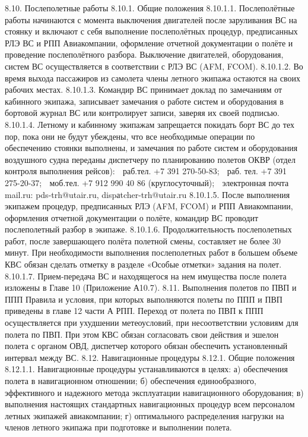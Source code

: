 8.10.	Послеполетные работы
8.10.1.	Общие положения
8.10.1.1. Послеполётные работы начинаются с момента выключения двигателей после заруливания ВС на стоянку и включают с себя выполнение послеполётных процедур, предписанных РЛЭ ВС и РПП Авиакомпании, оформление отчетной документации о полёте и проведение послеполётного разбора.
Выключение двигателей, оборудования, систем ВС осуществляется в соответствии с РЛЭ ВС (AFM, FCOM).       
8.10.1.2. Во время выхода пассажиров из самолета члены летного экипажа остаются на своих рабочих 
местах.
8.10.1.3. Командир ВС принимает доклад по замечаниям от кабинного экипажа, записывает замечания о работе систем и оборудования в бортовой журнал ВС или контролирует записи, заверяя их своей подписью.
8.10.1.4. Летному и кабинному экипажам запрещается покидать борт ВС до тех пор, пока они не будут убеждены, что все необходимые операции по обеспечению стоянки выполнены, и замечания по работе систем и оборудования воздушного судна переданы диспетчеру по планированию полетов ОКВР (отдел контроля выполнения рейсов):
 раб.тел. +7 391 270-50-83;
 раб. тел. +7 391 275-20-37;
 моб.тел. +7 912 990 40 86 (круглосуточный);
 электронная почта mail.ru: pds-trh@utair.ru, dispаtcher-trh@utair.ru
8.10.1.5. После выполнения экипажем процедур, предписанных РЛЭ (AFM, FCOM) и РПП Авиакомпании, оформления отчетной документации о полёте, командир ВС проводит послеполетный разбор в экипаже.
8.10.1.6. Продолжительность послеполетных работ, после завершающего полёта полетной смены, составляет не более 30 минут. При необходимости выполнения послеполетных работ в большем объеме КВС обязан сделать отметку в разделе «Особые отметки» задания на полет.
8.10.1.7. Прием-передача ВС и находящегося на нем имущества после полета изложены в Главе 10 (Приложение А10.7).
8.11.	Выполнения полетов по ПВП и ППП
Правила и условия, при которых выполняются полеты по ППП и ПВП приведены в главе 12 части А РПП. Переход от полета по ПВП к ППП осуществляется при ухудшении метеоусловий, при несоответствии условиям для полета по ПВП. При этом КВС обязан согласовать свои действия и эшелон полета с органом ОВД, диспетчер которого обязан обеспечить установленный интервал между ВС.
8.12.	Навигационные процедуры
8.12.1. Общие положения
8.12.1.1. Навигационные процедуры устанавливаются в целях: 
а)	обеспечения полета в навигационном отношении;
б)	обеспечения единообразного, эффективного и надежного метода эксплуатации навигационного оборудования;
в)	выполнения настоящих стандартных навигационных процедур всем персоналом летных экипажей авиакомпании;
г)	оптимального распределения нагрузки на членов летного экипажа при подготовке и выполнении полета.
